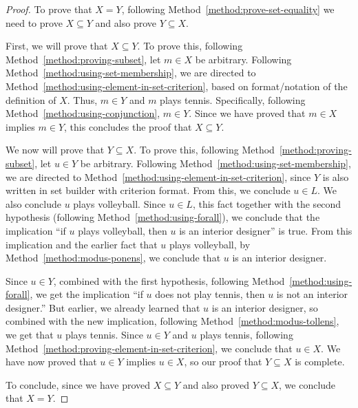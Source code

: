 \documentclass{book}
\theoremstyle{ekimcustom}
\begin{document}
\begin{proof}
To prove that $X=Y$, following Method~\ref{method:prove-set-equality} we need to prove $X \subseteq Y$ and also prove $Y \subseteq X$.

First, we will prove that $X \subseteq Y$. To prove this, following Method~\ref{method:proving-subset}, let $m \in X$ be arbitrary.
Following Method~\ref{method:using-set-membership}, we are directed to Method~\ref{method:using-element-in-set-criterion}, based on format/notation of the definition of $X$. Thus, $m \in Y$ and $m$ plays tennis. Specifically, following Method~\ref{method:using-conjunction}, $m \in Y$. Since we have proved that $m \in X$ implies $m \in Y$, this concludes the proof that $X \subseteq Y$.

We now will prove that $Y \subseteq X$.  To prove this, following Method~\ref{method:proving-subset}, let $u \in Y$ be arbitrary.
Following Method~\ref{method:using-set-membership}, we are directed to Method~\ref{method:using-element-in-set-criterion}, since $Y$ is also written in set builder with criterion format. From this, we conclude $u \in L$. We also conclude $u$ plays volleyball. Since $u \in L$, this fact together with the second hypothesis (following Method~\ref{method:using-forall}), we conclude that the implication ``if $u$ plays volleyball, then $u$ is an interior designer'' is true. From this implication and the earlier fact that $u$ plays volleyball, by Method~\ref{method:modus-ponens}, we conclude that $u$ is an interior designer.

Since $u \in Y$, combined with the first hypothesis, following Method~\ref{method:using-forall}, we get the implication ``if $u$ does not play tennis, then $u$ is not an interior designer.'' But earlier, we already learned that $u$ is an interior designer, so combined with the new implication, following Method~\ref{method:modus-tollens}, we get that $u$ plays tennis. Since $u \in Y$ and $u$ plays tennis, following Method~\ref{method:proving-element-in-set-criterion}, we conclude that $u \in X$. We have now proved that $u \in Y$ implies $u \in X$, so our proof that $Y \subseteq X$ is complete.

To conclude, since we have proved $X \subseteq Y$ and also proved $Y \subseteq X$, we conclude that $X=Y$.
\end{proof}
\end{document}
